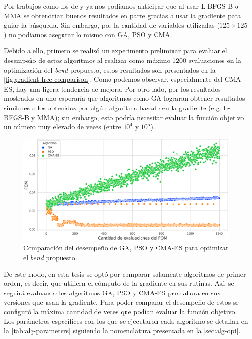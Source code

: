 Por trabajos como los de \cite{Su2020} y \cite{Christiansen2021} ya nos podíamos anticipar que al usar
L-BFGS-B o MMA se obtendrían buenos resultados en parte gracias a usar la gradiente para guiar la búsqueda.
Sin embargo, por la cantidad de variables utilizadas ($125 \times 125$) no podíamos asegurar lo mismo
con GA, PSO y CMA. 

Debido a ello, primero se realizó un experimento preliminar para evaluar el desempeño de estos
algoritmos al realizar como máximo 1200 evaluaciones en la optimización del \emph{bend} propuesto, 
estos resultados son presentados en la \autoref{fig:gradient-free-comparison}.
Como podemos observar, especialmente del CMA-ES, hay una ligera tendencia de mejora.
Por otro lado, por los resultados mostrados en \cite{Christiansen2021matlab} uno esperaría que algoritmos como GA lograran 
obtener resultados similares a los obtenidos por algún algoritmo basado en la gradiente (e.g. L-BFGS-B y MMA); 
sin embargo, esto podría necesitar evaluar la función objetivo un número muy elevado de veces (entre $10^4$ y $10^5$).

\begin{figure}[ht]
  \centering
  \includegraphics[width=1.0\textwidth]{image/proposal/bend-opt-cont.png}
  \caption{Comparación del desempeño de GA, PSO y CMA-ES para optimizar el \emph{bend} propuesto.}
  \label{fig:gradient-free-comparison}
\end{figure}


De este modo, en esta tesis se optó por comparar solamente algoritmos de primer orden, es decir, que utilicen
el cómputo de la gradiente en sus rutinas. Así, se seguirá evaluando los algoritmos GA, PSO y CMA-ES pero
ahora en sus versiones que usan la gradiente.
Para poder comparar el desempeño de estos se configuró la máxima cantidad de veces que podían
evaluar la función objetivo. 
Los parámetros específicos con los que se ejecutaron cada algoritmo se detallan en la
\autoref{tab:alg-parameters} siguiendo la nomenclatura presentada en la \autoref{sec:alg-opt}.

